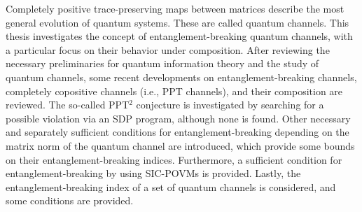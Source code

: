 Completely positive trace-preserving maps between matrices describe the most general evolution of quantum systems. These are called quantum channels. This thesis investigates the concept of entanglement-breaking quantum channels, with a particular focus on their behavior under composition. After reviewing the necessary preliminaries for quantum information theory and the study of quantum channels, some recent developments on entanglement-breaking channels, completely copositive channels (i.e., PPT channels), and their composition are reviewed. The so-called PPT$^2$ conjecture is investigated by searching for a possible violation via an SDP program, although none is found. Other necessary and separately sufficient conditions for entanglement-breaking depending on the matrix norm of the quantum channel are introduced, which provide some bounds on their entanglement-breaking indices. Furthermore, a sufficient condition for entanglement-breaking by using SIC-POVMs is provided. Lastly, the entanglement-breaking index of a set of quantum channels is considered, and some conditions are provided. 
 